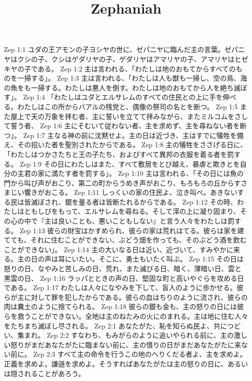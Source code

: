 

\title{Zephaniah}

Zep 1:1  ユダの王アモンの子ヨシヤの世に、ゼパニヤに臨んだ主の言葉。ゼパニヤはクシの子、クシはゲダリヤの子、ゲダリヤはアマリヤの子、アマリヤはヒゼキヤの子である。
Zep 1:2  主は言われる、「わたしは地のおもてからすべてのものを一掃する」。
Zep 1:3  主は言われる、「わたしは人も獣も一掃し、空の鳥、海の魚をも一掃する。わたしは悪人を倒す。わたしは地のおもてから人を絶ち滅ぼす」。
Zep 1:4  「わたしはユダとエルサレムのすべての住民との上に手を伸べる。わたしはこの所からバアルの残党と、偶像の祭司の名とを断つ。
Zep 1:5  また屋上で天の万象を拝む者、主に誓いを立てて拝みながら、またミルコムをさして誓う者、
Zep 1:6  主にそむいて従わない者、主を求めず、主を尋ねない者を断つ」。
Zep 1:7  主なる神の前に沈黙せよ。主の日は近づき、主はすでに犠牲を備え、その招いた者を聖別されたからである。
Zep 1:8  主の犠牲をささげる日に、「わたしはつかさたちと王の子たち、およびすべて異邦の衣服を着る者を罰する。
Zep 1:9  その日にわたしはまた、すべて敷居をとび越え、暴虐と欺きとを自分の主君の家に満たす者を罰する」。
Zep 1:10  主は言われる、「その日には魚の門から叫び声がおこり、第二の町からうめき声がおこり、もろもろの丘からすさまじい響きがおこる。
Zep 1:11  しっくいの家の住民よ、泣き叫べ。あきないする民は皆滅ぼされ、銀を量る者は皆断たれるからである。
Zep 1:12  その時、わたしはともしびをもって、エルサレムを尋ねる。そして滓の上に凝り固まり、その心の中で『主は良いことも、悪いこともしない』と言う人々をわたしは罰する。
Zep 1:13  彼らの財宝はかすめられ、彼らの家は荒れはてる。彼らは家を建てても、それに住むことができない、ぶどう畑を作っても、そのぶどう酒を飲むことができない」。
Zep 1:14  主の大いなる日は近い、近づいて、すみやかに来る。主の日の声は耳にいたい。そこに、勇士もいたく叫ぶ。
Zep 1:15  その日は怒りの日、なやみと苦しみの日、荒れ、また滅びる日、暗く、薄暗い日、雲と黒雲の日、
Zep 1:16  ラッパとときの声の日、堅固な町と高いやぐらを攻める日である。
Zep 1:17  わたしは人々になやみを下して、盲人のように歩かせる。彼らが主に対して罪を犯したからである。彼らの血はちりのように流され、彼らの肉は糞土のように捨てられる。
Zep 1:18  彼らの銀も金も、主の怒りの日には彼らを救うことができない。全地は主のねたみの火にのまれる。主は地に住む人々をたちまち滅ぼし尽される。
Zep 2:1  あなたがた、恥を知らぬ民よ、共につどい、集まれ。
Zep 2:2  すなわち、もみがらのように追いやられる前に、主の激しい怒りがまだあなたがたに臨まない前に、主の憤りの日がまだあなたがたに来ない前に。
Zep 2:3  すべて主の命令を行うこの地のへりくだる者よ、主を求めよ。正義を求めよ。謙遜を求めよ。そうすればあなたがたは主の怒りの日に、あるいは隠されることがあろう。
